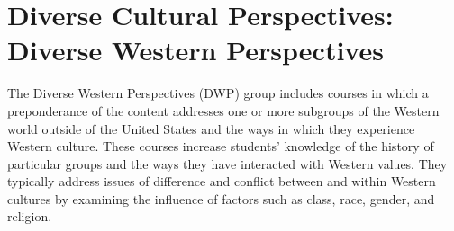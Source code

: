\documentclass[
  letterpaper,
]{scrbook}
\begin{document}
\section{Diverse Cultural Perspectives: Diverse Western
Perspectives}\label{sec-diverse-cultural-perspectives-western}

The Diverse Western Perspectives (DWP) group includes courses in which a
preponderance of the content addresses one or more subgroups of the
Western world outside of the United States and the ways in which they
experience Western culture. These courses increase students' knowledge
of the history of particular groups and the ways they have interacted
with Western values. They typically address issues of difference and
conflict between and within Western cultures by examining the influence
of factors such as class, race, gender, and religion.
\end{document}
